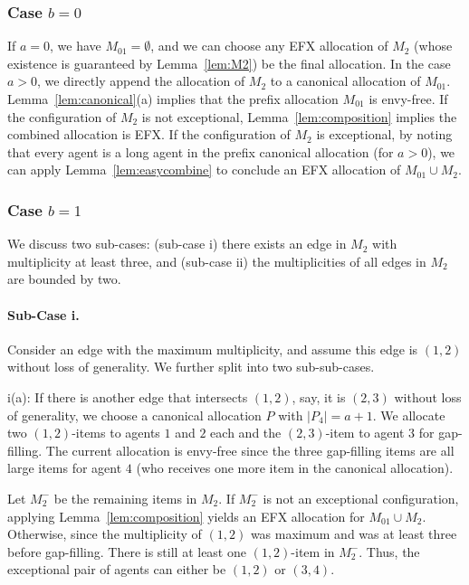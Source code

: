\documentclass{article}
\theoremstyle{definition}
\begin{document}
\subsubsection{Case $b=0$}
\label{subsec:b=0}
If $a=0$, we have $M_{01}=\emptyset$, and we can choose any EFX allocation of $M_2$ (whose existence is guaranteed by Lemma~\ref{lem:M2}) be the final allocation.
In the case $a>0$, we directly append the allocation of $M_2$ to a canonical allocation of $M_{01}$.
Lemma~\ref{lem:canonical}(a) implies that the prefix allocation $M_{01}$ is envy-free.
If the configuration of $M_2$ is not exceptional, Lemma~\ref{lem:composition} implies the combined allocation is EFX.
If the configuration of $M_2$ is exceptional, by noting that every agent is a long agent in the prefix canonical allocation (for $a>0$), we can apply Lemma~\ref{lem:easycombine} to conclude an EFX allocation of $M_{01}\cup M_2$.


\subsubsection{Case $b=1$}
We discuss two sub-cases: (sub-case i) there exists an edge in $M_2$ with multiplicity at least three, and (sub-case ii) the multiplicities of all edges in $M_2$ are bounded by two.

\paragraph{Sub-Case i.}
Consider an edge with the maximum multiplicity, and assume this edge is $(1,2)$ without loss of generality. We further split into two sub-sub-cases.

i(a): If there is another edge that intersects $(1,2)$, say, it is $(2,3)$ without loss of generality, we choose a canonical allocation $P$ with $|P_4|=a+1$. 
We allocate two $(1,2)$-items to agents $1$ and $2$ each and the $(2,3)$-item to agent $3$ for gap-filling.
The current allocation is envy-free since the three gap-filling items are all large items for agent $4$ (who receives one more item in the canonical allocation).

Let $M_2^-$ be the remaining items in $M_2$.
If $M_2^-$ is not an exceptional configuration, applying Lemma~\ref{lem:composition} yields an EFX allocation for $M_{01}\cup M_2$.
Otherwise, since the multiplicity of $(1,2)$ was maximum and was at least three before gap-filling.
There is still at least one $(1,2)$-item in $M_2^-$.
Thus, the exceptional pair of agents can either be $(1,2)$ or $(3,4)$.
\end{document}
